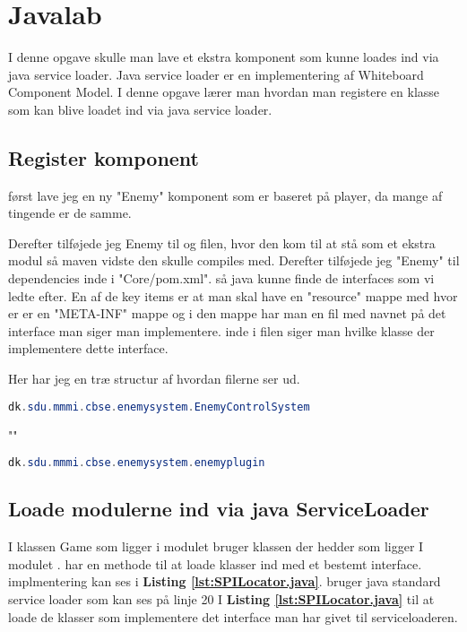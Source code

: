 \section{Javalab}
I denne opgave skulle man lave et ekstra komponent som kunne loades ind via
java service loader. Java service loader er en implementering af Whiteboard
Component Model. I denne opgave lærer man hvordan man registere en klasse som
kan blive loadet ind via java service loader.


\subsection{Register komponent}
først lave jeg en ny "Enemy" komponent som er baseret på player, da mange af
tingende er de samme. 

Derefter tilføjede jeg Enemy til  og  filen,
hvor den kom til at stå som et ekstra modul så maven vidste den skulle compiles
med. Derefter tilføjede jeg "Enemy" til dependencies inde i "Core/pom.xml". så
java kunne finde de interfaces som vi ledte efter.  En af de key items er at
man skal have en "resource" mappe med hvor er er en "META-INF" mappe og i den
mappe har man en fil med navnet på det interface man siger man implementere.
inde i filen siger man hvilke klasse der implementere dette interface.

Her har jeg en træ structur af hvordan filerne ser ud.

\hfill \linebreak \hline 
{}
\hline \hfill \linebreak

\begin{lstlisting}[caption={dk.sdu.mmmi.cbse.common.services.IEntityProcessingService}, label={lst:App}, language=java]
dk.sdu.mmmi.cbse.enemysystem.EnemyControlSystem
\end{lstlisting}
""
\begin{lstlisting}[caption={dk.sdu.mmmi.cbse.common.services.igamepluginservice}, label={lst:app}, language=java]
dk.sdu.mmmi.cbse.enemysystem.enemyplugin
\end{lstlisting}


\subsection{Loade modulerne ind via java ServiceLoader}
I klassen Game som ligger i modulet  bruger klassen der hedder
 som ligger I modulet .  har en
methode til at loade klasser ind med et bestemt interface. 
implmentering kan ses i \textbf{Listing \ref{lst:SPILocator.java}}.
 bruger java standard service loader som kan ses på linje 20
I \textbf{Listing \ref{lst:SPILocator.java}} til at loade de klasser som
implementere det interface man har givet til serviceloaderen. 



